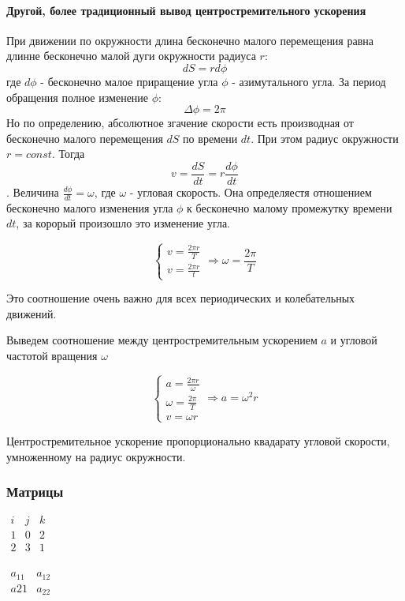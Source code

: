 \documentclass{article}
\begin{document}
\paragraph{Другой, более традиционный вывод центростремительного ускорения}
При движении по окружности длина бесконечно малого перемещения равна длинне бесконечно малой дуги окружности радиуса $r$:$$dS = r d\phi$$
где $d\phi$ - бесконечно малое приращение угла $\phi$ - азимутального угла. За период обращения полное изменение $\phi$: $$\Delta \phi = 2 \pi$$ Но по определению, абсолютное згачение скорости есть производная от бесконечно малого перемещения $dS$ по времени $dt$. При этом радиус окружности $r=const$. Тогда $$v=\frac{dS}{dt} = r\frac{d\phi}{dt}$$. Величина $\frac{d\phi}{dt} = \omega$, 	где $\omega$ - угловая скорость. Она определяестя отношением бесконечно малого изменения угла $\phi$ к бесконечно малому промежутку времени $dt$, за корорый произошло это изменение угла.

$$
\begin{cases}
v=\frac{2\pi r}{T}
\\
v=\frac{2\pi r }{t}
\end{cases} \Rightarrow \omega = \frac{2\pi}{T}
$$

Это соотношение очень важно для всех периодических и колебательных движений.

Выведем соотношение между центростремительным ускорением $a$ и угловой частотой вращения $\omega$

$$
\begin{cases}
a = \frac{2\pi r}{\omega}
\\
\omega = \frac{2 \pi}{T}
\\
v= \omega r
\end{cases} \Rightarrow a = \omega^2r
$$

Центростремительное ускорение пропорционально квадарату угловой скорости, умноженному на радиус окружности.

\subsubsection{Матрицы}

$\begin{matrix}
	i & j & k\\
	1 & 0 & 2\\
	2& 3 & 1\\
\end{matrix}$

$\begin{matrix}
	a_{11} & a_{12} \\
	a{21}& a_{22} \\
\end{matrix}$
\end{document}
